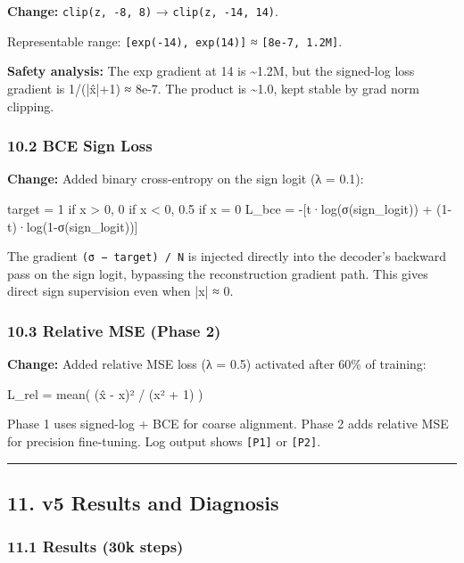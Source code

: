 \documentclass[11pt]{article}
\begin{document}
\textbf{Change:} \texttt{clip(z, -8, 8)} → \texttt{clip(z, -14, 14)}.


Representable range: \texttt{[exp(-14), exp(14)]} ≈ \texttt{[8e-7, 1.2M]}.


\textbf{Safety analysis:} The exp gradient at 14 is \textasciitilde{}1.2M, but the signed-log loss gradient is 1/(|x̂|+1) ≈ 8e-7. The product is \textasciitilde{}1.0, kept stable by grad norm clipping.


\subsubsection*{10.2 BCE Sign Loss}


\textbf{Change:} Added binary cross-entropy on the sign logit (λ = 0.1):


\begin{CodeBlock}
target = 1 if x > 0, 0 if x < 0, 0.5 if x = 0
L_bce  = -[t·log(σ(sign_logit)) + (1-t)·log(1-σ(sign_logit))]
\end{CodeBlock}


The gradient \texttt{(σ − target) / N} is injected directly into the decoder's backward pass on the sign logit, bypassing the reconstruction gradient path. This gives direct sign supervision even when |x| ≈ 0.


\subsubsection*{10.3 Relative MSE (Phase 2)}


\textbf{Change:} Added relative MSE loss (λ = 0.5) activated after 60\% of training:


\begin{CodeBlock}
L_rel = mean( (x̂ - x)² / (x² + 1) )
\end{CodeBlock}


Phase 1 uses signed-log + BCE for coarse alignment. Phase 2 adds relative MSE for precision fine-tuning. Log output shows \texttt{[P1]} or \texttt{[P2]}.


\noindent\rule{\textwidth}{0.4pt}


\subsection*{11. v5 Results and Diagnosis}


\subsubsection*{11.1 Results (30k steps)}
\end{document}
